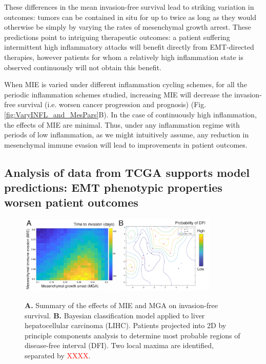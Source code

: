 \documentclass[11pt]{article}
\newcommand{\tcr} { \textcolor{red} }
\begin{document}

\par
These differences in the mean invasion-free survival lead to striking variation in outcomes: tumors can be contained in situ for up to twice as long as they would otherwise be simply by varying the rates of mesenchymal growth arrest. These predictions point to intriguing therapeutic outcomes: a patient suffering intermittent high inflammatory attacks will benefit directly from EMT-directed therapies, however patients for whom a relatively high inflammation state is observed continuously will not obtain this benefit.
\par
When MIE is varied under different inflammation cycling schemes, for all the periodic inflammation schemes studied, increasing MIE will decrease the invasion-free survival (i.e. worsen cancer progression and prognosis)  (Fig. \ref{fig:VaryINFL_and_MesPars}B). In the case of continuously high inflammation, the effects of MIE are minimal. Thus, under any inflammation regime with periods of low inflammation, as we might intuitively assume, any reduction in mesenchymal immune evasion will lead to improvements in patient outcomes.


\subsection{Analysis of data from TCGA supports model predictions: EMT phenotypic properties worsen patient outcomes}\label{tcga}

\begin{figure}
\center
{\includegraphics[width=0.85\textwidth]{Figure5/FigHeatmapLIHC.pdf}}
\caption{{\bf A.} Summary of the effects of MIE and MGA on invasion-free survival.
  {\bf B.} Bayesian classification model applied to liver hepatocellular carcinoma (LIHC). Patients projected into 2D by principle components analysis to determine most probable regions of disease-free interval (DFI). Two local maxima are identified, separated by \tcr{XXXX}.
}
\label{fig:MIEvsMGA}
\end{figure}
\end{document}
